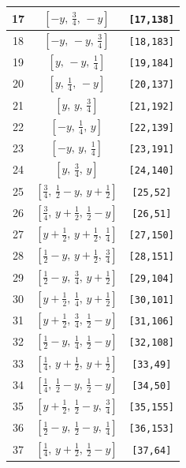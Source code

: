 \documentclass[fleqn,8pt]{jsarticle}
\begin{document}
\begin{longtable}{ccc}
17 & $\left[ - y,\, \frac{3}{4},\, - y \right]$ & {\tt [17,138]} \\ \hline
18 & $\left[ - y,\, - y,\, \frac{3}{4} \right]$ & {\tt [18,183]} \\ \hline
19 & $\left[ y,\, - y,\, \frac{1}{4} \right]$ & {\tt [19,184]} \\ \hline
20 & $\left[ y,\, \frac{1}{4},\, - y \right]$ & {\tt [20,137]} \\ \hline
21 & $\left[ y,\, y,\, \frac{3}{4} \right]$ & {\tt [21,192]} \\ \hline
22 & $\left[ - y,\, \frac{1}{4},\, y \right]$ & {\tt [22,139]} \\ \hline
23 & $\left[ - y,\, y,\, \frac{1}{4} \right]$ & {\tt [23,191]} \\ \hline
24 & $\left[ y,\, \frac{3}{4},\, y \right]$ & {\tt [24,140]} \\ \hline
25 & $\left[ \frac{3}{4},\, \frac{1}{2} - y,\, y + \frac{1}{2} \right]$ & {\tt [25,52]} \\ \hline
26 & $\left[ \frac{3}{4},\, y + \frac{1}{2},\, \frac{1}{2} - y \right]$ & {\tt [26,51]} \\ \hline
27 & $\left[ y + \frac{1}{2},\, y + \frac{1}{2},\, \frac{1}{4} \right]$ & {\tt [27,150]} \\ \hline
28 & $\left[ \frac{1}{2} - y,\, y + \frac{1}{2},\, \frac{3}{4} \right]$ & {\tt [28,151]} \\ \hline
29 & $\left[ \frac{1}{2} - y,\, \frac{3}{4},\, y + \frac{1}{2} \right]$ & {\tt [29,104]} \\ \hline
30 & $\left[ y + \frac{1}{2},\, \frac{1}{4},\, y + \frac{1}{2} \right]$ & {\tt [30,101]} \\ \hline
31 & $\left[ y + \frac{1}{2},\, \frac{3}{4},\, \frac{1}{2} - y \right]$ & {\tt [31,106]} \\ \hline
32 & $\left[ \frac{1}{2} - y,\, \frac{1}{4},\, \frac{1}{2} - y \right]$ & {\tt [32,108]} \\ \hline
33 & $\left[ \frac{1}{4},\, y + \frac{1}{2},\, y + \frac{1}{2} \right]$ & {\tt [33,49]} \\ \hline
34 & $\left[ \frac{1}{4},\, \frac{1}{2} - y,\, \frac{1}{2} - y \right]$ & {\tt [34,50]} \\ \hline
35 & $\left[ y + \frac{1}{2},\, \frac{1}{2} - y,\, \frac{3}{4} \right]$ & {\tt [35,155]} \\ \hline
36 & $\left[ \frac{1}{2} - y,\, \frac{1}{2} - y,\, \frac{1}{4} \right]$ & {\tt [36,153]} \\ \hline
37 & $\left[ \frac{1}{4},\, y + \frac{1}{2},\, \frac{1}{2} - y \right]$ & {\tt [37,64]} \\ \hline

\end{longtable}
\end{document}
